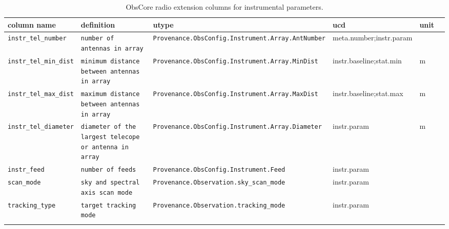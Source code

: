 \documentclass[11pt,a4paper]{ivoa}
\begin{document}
\begin{landscape}
\begin{longtable}{l p{4.2cm} | p{4cm} | l l l }
\hline
\textbf{column name}&\textbf{definition}&\textbf{utype}&\textbf{ucd}&\textbf{unit}\\
\hline
\texttt{instr\_tel\_number}&\texttt{number of antennas in array}&\texttt{Provenance.ObsConfig.\newline Instrument.Array.\newline AntNumber}&meta.number;instr.param& \\
\hline
\texttt{instr\_tel\_min\_dist}&\texttt{minimum distance between antennas in array}&\texttt{Provenance.ObsConfig.\newline Instrument.Array.\newline MinDist}&instr.baseline;stat.min&m \\
\hline
\texttt{instr\_tel\_max\_dist}&\texttt{maximum distance between antennas in array}&\texttt{Provenance.ObsConfig.\newline Instrument.Array.\newline MaxDist}&instr.baseline;stat.max&m \\
\hline
\texttt{instr\_tel\_diameter}&\texttt{diameter of the largest telecope or antenna in array}&\texttt{Provenance.ObsConfig.\newline Instrument.Array.\newline Diameter}&instr.param&m \\
\hline
\texttt{instr\_feed}&\texttt{number of feeds}&\texttt{Provenance.ObsConfig.\newline Instrument.Feed}&instr.param&  \\
\hline
\texttt{scan\_mode}&\texttt{sky and spectral axis scan mode }&\texttt{Provenance.\newline Observation.\newline sky\_scan\_mode}&instr.param& \\
\hline
\texttt{tracking\_type}&\texttt{target tracking mode}&\texttt{Provenance.\newline Observation.\newline tracking\_mode}&instr.param& \\
\hline

\caption{ObsCore radio extension columns for instrumental parameters.}
\label{tab:ExtensionAtt_instrumental}
\end{longtable}
\end{landscape}
\end{document}
